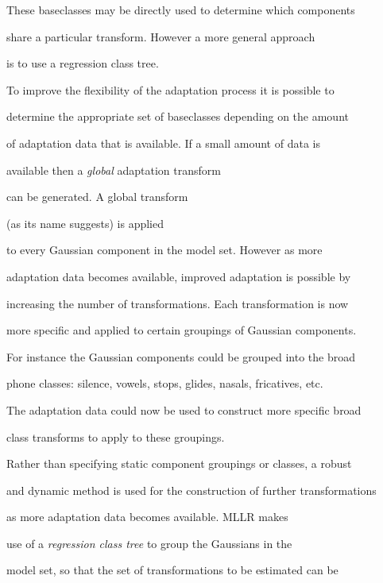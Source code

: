 These baseclasses may be directly used to determine which components


share a particular transform. However a more general approach


is to use a regression class tree.









To improve the flexibility of the adaptation process it is possible to


determine the appropriate set of baseclasses depending on the amount


of adaptation data that is available. If a small amount of data is


available then a \textit{global} adaptation transform


 can be generated. A global transform 


(as its name suggests) is applied


to every Gaussian component in the model set. However as more


adaptation data becomes available, improved adaptation is possible by


increasing the number of transformations. Each transformation is now


more specific and applied to certain groupings of Gaussian components.


For instance the Gaussian components could be grouped into the broad 


phone classes: silence, vowels, stops, glides, nasals, fricatives, etc.


The adaptation data could now be used to construct more specific broad


class transforms to apply to these groupings.





Rather than specifying static component groupings or classes, a robust


and dynamic method is used for the construction of further transformations


as more adaptation data becomes available. MLLR makes


use of a \textit{regression class tree} to group the Gaussians in the


model set, so that the set of transformations to be estimated can be


